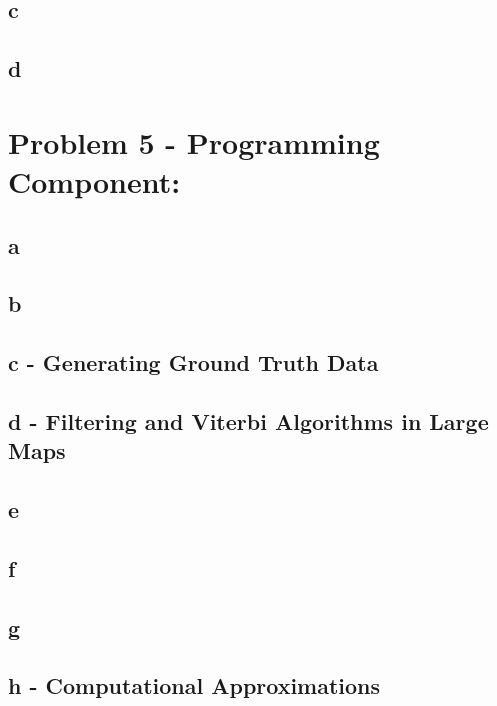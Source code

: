 \documentclass[11pt, oneside]{article}   	%
\begin{document}
\begin{flushleft}
\subsection*{c}
\subsection*{d}
\section*{Problem 5 - Programming Component:}
\subsection*{a}
\subsection*{b}
\subsection*{c - Generating Ground Truth Data}
\subsection*{d - Filtering and Viterbi Algorithms in Large Maps}
\subsection*{e}
\subsection*{f}
\subsection*{g}
\subsection*{h - Computational Approximations}
\end{flushleft}
\end{document}
